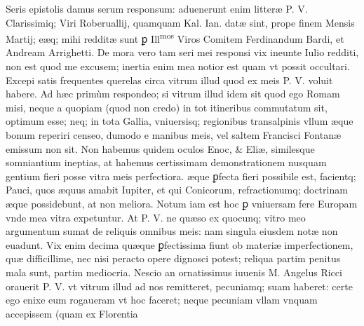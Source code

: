 \documentclass[11pt,a4paper]{article}
\begin{document}
Seris epistolis damus serum responsum: aduenerunt enim litteræ P. V. Clarissimiq; Viri Roberuallij, quamquam Kal. Ian. datæ sint, prope finem Mensis Martij; eæq; mihi redditæ sunt ꝑ Ill\textsuperscript{mos} Viros Comitem Ferdinandum Bardi, et Andream Arrighetti. De mora vero tam seri mei responsi vix ineunte Iulio redditi, non est quod me excusem; inertia enim mea notior est quam vt possit occultari. Excepi satis frequentes querelas circa vitrum illud quod ex meis P. V. voluit habere. Ad hæc primùm respondeo; si vitrum illud idem sit quod ego Romam misi, neque a quopiam (quod non credo) in tot itineribus commutatum sit, optimum esse; neq; in tota Gallia, vniuersisq; regionibus transalpinis vllum æque bonum reperiri censeo, dumodo e manibus meis, vel saltem Francisci Fontanæ emissum non sit. Non habemus quidem oculos Enoc, \& Eliæ, similesque somniantium ineptias, at habemus certissimam demonstrationem nusquam gentium fieri posse vitra meis perfectiora. æque ꝑfecta fieri possibile est, facientq; Pauci, quos æquus amabit Iupiter, et qui Conicorum, refractionumq; doctrinam æque possidebunt, at non meliora. Notum iam est hoc ꝑ vniuersam fere Europam vnde mea vitra expetuntur. At P. V. ne quæso ex quocunq; vitro meo argumentum sumat de reliquis omnibus meis: nam singula eiusdem notæ non euadunt. Vix enim decima quæque ꝑfectissima fiunt ob materiæ imperfectionem, quæ difficillime, nec nisi peracto opere dignosci potest; reliqua partim penitus mala sunt, partim mediocria. Nescio an ornatissimus iuuenis M. Angelus Ricci orauerit P. V. vt vitrum illud ad nos remitteret, pecuniamq; suam haberet: certe ego enixe eum rogaueram vt hoc faceret; neque pecuniam vllam vnquam accepissem (quam ex Florentia

\end{document}
